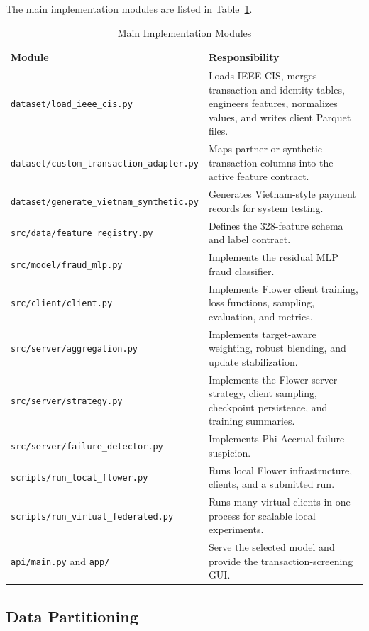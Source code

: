 \documentclass[conference]{IEEEtran}
\begin{document}
The main implementation modules are listed in Table~\ref{tab:modules}.

\begin{table}[t]
\caption{Main Implementation Modules}
\label{tab:modules}
\centering
\begin{tabular}{p{}p{}}
\toprule
\textbf{Module} & \textbf{Responsibility} \\
\midrule
\texttt{dataset/load\_ieee\_cis.py} & Loads IEEE-CIS, merges transaction and identity tables, engineers features, normalizes values, and writes client Parquet files. \\
\texttt{dataset/custom\_transaction\_adapter.py} & Maps partner or synthetic transaction columns into the active feature contract. \\
\texttt{dataset/generate\_vietnam\_synthetic.py} & Generates Vietnam-style payment records for system testing. \\
\texttt{src/data/feature\_registry.py} & Defines the 328-feature schema and label contract. \\
\texttt{src/model/fraud\_mlp.py} & Implements the residual MLP fraud classifier. \\
\texttt{src/client/client.py} & Implements Flower client training, loss functions, sampling, evaluation, and metrics. \\
\texttt{src/server/aggregation.py} & Implements target-aware weighting, robust blending, and update stabilization. \\
\texttt{src/server/strategy.py} & Implements the Flower server strategy, client sampling, checkpoint persistence, and training summaries. \\
\texttt{src/server/failure\_detector.py} & Implements Phi Accrual failure suspicion. \\
\texttt{scripts/run\_local\_flower.py} & Runs local Flower infrastructure, clients, and a submitted run. \\
\texttt{scripts/run\_virtual\_federated.py} & Runs many virtual clients in one process for scalable local experiments. \\
\texttt{api/main.py} and \texttt{app/} & Serve the selected model and provide the transaction-screening GUI. \\
\bottomrule
\end{tabular}
\end{table}

\subsection{Data Partitioning}
\end{document}
